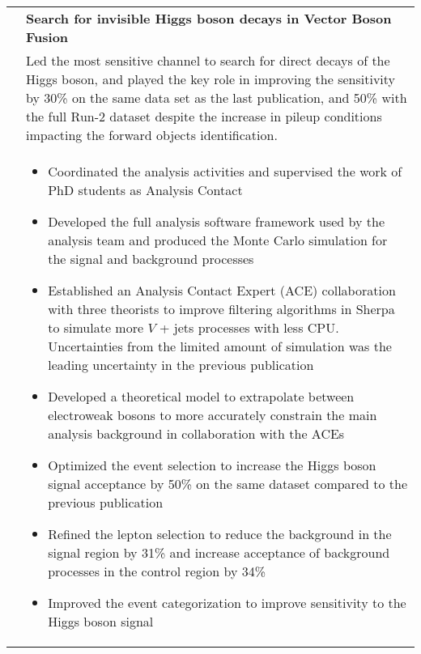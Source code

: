 \documentclass[a4paper,10pt]{article}
\begin{document}
\begin{tabularx}{\textwidth}{>{\centering\arraybackslash}X p{} }
{\bf Analysis} &  \textbf{Search for invisible Higgs boson decays in Vector Boson Fusion} \\
			   & Led the most sensitive channel to search for direct decays of the Higgs boson, and played the key role in improving the sensitivity
         by 30\% on the same data set as the last publication, and 50\% with the full Run-2 dataset despite the increase in pileup conditions impacting the forward objects identification. \\
			   & \begin{itemize}
         \item Coordinated the analysis activities and supervised the work of PhD students as Analysis Contact
			   \item Developed the full analysis software framework used by the analysis team and produced the Monte Carlo simulation for the signal and background processes
			   \item Established an Analysis Contact Expert (ACE) collaboration with three theorists to improve filtering algorithms in Sherpa to simulate more $V$ + jets processes with less CPU. Uncertainties from the limited amount of simulation was the leading uncertainty in the previous publication
				\item Developed a theoretical model to extrapolate between electroweak bosons to more accurately constrain the main analysis background in collaboration with the ACEs
				\item Optimized the event selection to increase the Higgs boson signal acceptance by 50\% on the same dataset compared to the previous publication
				\item Refined the lepton selection to reduce the background in the signal region by 31\% and increase acceptance of background processes in the control region by 34\%
				\item Improved the event categorization to improve sensitivity to the Higgs boson signal
			  \end{itemize}\\[-1.5ex]
\end{tabularx}


\vspace{3mm}
\end{document}
